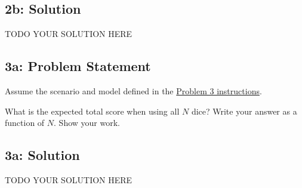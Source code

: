 \documentclass[10pt]{article}
\newcommand{\officialdirections}[1]{{\color{purple} #1}}
\begin{document}
\subsection{2b: Solution}
TODO YOUR SOLUTION HERE



\newpage
\officialdirections{
\subsection*{3a: Problem Statement}
Assume the scenario and model defined in the \href{https://www.cs.tufts.edu/cs/136/2024s/hw0.html#problem-3}{Problem 3 instructions}. 

What is the expected total score when using all $N$ dice? Write your answer as a function of $N$. Show your work.
}

\subsection{3a: Solution}

TODO YOUR SOLUTION HERE
\end{document}
